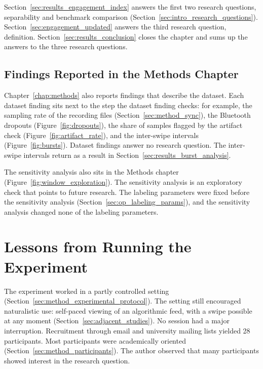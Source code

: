 \documentclass[12pt,a4paper]{report}
\begin{document}
Section~\ref{sec:results_engagement_index} answers the first two research questions, separability and benchmark comparison (Section~\ref{sec:intro_research_questions}). Section~\ref{sec:engagement_updated} answers the third research question, definition. Section~\ref{sec:results_conclusion} closes the chapter and sums up the answers to the three research questions.

\subsection*{Findings Reported in the Methods Chapter}

Chapter~\ref{chap:methods} also reports findings that describe the dataset. Each dataset finding sits next to the step the dataset finding checks: for example, the sampling rate of the recording files (Section~\ref{sec:method_sync}), the Bluetooth dropouts (Figure~\ref{fig:dropouts}), the share of samples flagged by the artifact check (Figure~\ref{fig:artifact_rate}), and the inter-swipe intervals (Figure~\ref{fig:bursts}). Dataset findings answer no research question. The inter-swipe intervals return as a result in Section~\ref{sec:results_burst_analysis}.

The sensitivity analysis also sits in the Methods chapter (Figure~\ref{fig:window_exploration}). The sensitivity analysis is an exploratory check that points to future research. The labeling parameters were fixed before the sensitivity analysis (Section~\ref{sec:op_labeling_params}), and the sensitivity analysis changed none of the labeling parameters.


\section{Lessons from Running the Experiment}
\label{sec:results_exp_learnings}

The experiment worked in a partly controlled setting (Section~\ref{sec:method_experimental_protocol}). The setting still encouraged naturalistic use: self-paced viewing of an algorithmic feed, with a swipe possible at any moment (Section~\ref{sec:adjacent_studies}). No session had a major interruption. Recruitment through email and university mailing lists yielded 28 participants. Most participants were academically oriented (Section~\ref{sec:method_participants}). The author observed that many participants showed interest in the research question.
\end{document}
